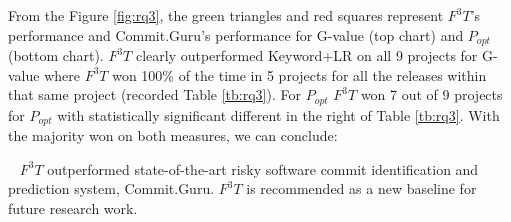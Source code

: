 \documentclass[sigconf,review, anonymous]{acmart}
\newenvironment{RQ}[1]%
{\noindent\begin{minipage}[c]{\linewidth}%
\begin{bclogo}[couleur=gray!25,%
                arrondi=0.1,%
                logo=\bctrombone,%
                ombre=true]{~#1}}%
{\end{bclogo}\end{minipage}\vspace{2mm}}
\begin{document}
From the Figure \ref{fig:rq3}, the green triangles and red squares represent $F^3T$'s performance and Commit.Guru's performance for G-value (top chart) and $P_{opt}$ (bottom chart). $F^3T$ clearly outperformed Keyword+LR on all 9 projects for G-value where $F^3T$ won 100\% of the time in 5 projects for all the releases within that same project (recorded Table \ref{tb:rq3}). For $P_{opt}$ $F^3T$ won 7 out of 9 projects for $P_{opt}$ with statistically significant different in the right of Table \ref{tb:rq3}. With the majority won on both measures, we can conclude: 


\begin{RQ}{}
\vspace{-10pt}
$F^3T$ outperformed state-of-the-art risky software commit identification and prediction system, Commit.Guru. $F^3T$ is recommended as a new baseline for future research work.
\end{RQ}




 

\end{document}
